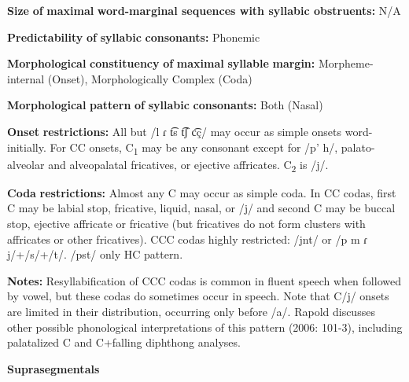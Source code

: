 \begin{styleBody}
\textbf{Size} \textbf{of} \textbf{maximal} \textbf{word{}-marginal sequences with syllabic obstruents:} N/A
\end{styleBody}

\begin{styleBody}
\textbf{Predictability} \textbf{of} \textbf{syllabic} \textbf{consonants:} Phonemic
\end{styleBody}

\begin{styleBody}
\textbf{Morphological} \textbf{constituency} \textbf{of} \textbf{maximal} \textbf{syllable} \textbf{margin:} Morpheme-internal (Onset), Morphologically Complex (Coda)
\end{styleBody}

\begin{styleBody}
\textbf{Morphological} \textbf{pattern} \textbf{of} \textbf{syllabic} \textbf{consonants:} Both (Nasal)
\end{styleBody}

\begin{styleBody}
\textbf{Onset} \textbf{restrictions:} All but /l ɾ t͡s t͡ʃ c͡ç/ may occur as simple onsets word-initially. For CC onsets, C\textsubscript{1} may be any consonant except for /p’ h/, palato-alveolar and alveopalatal fricatives, or ejective affricates. C\textsubscript{2} is /j/.
\end{styleBody}

\begin{styleBody}
\textbf{Coda} \textbf{restrictions:} Almost any C may occur as simple coda. In CC codas, first C may be labial stop, fricative, liquid, nasal, or /j/ and second C may be buccal stop, ejective affricate or fricative (but fricatives do not form clusters with affricates or other fricatives). CCC codas highly restricted: /jnt/ or /p m ɾ j/+/s/+/t/. /pst/ only HC pattern.
\end{styleBody}

\begin{styleBody}
\textbf{Notes:} Resyllabification of CCC codas is common in fluent speech when followed by vowel, but these codas do sometimes occur in speech. Note that C/j/ onsets are limited in their distribution, occurring only before /a/. Rapold discusses other possible phonological interpretations of this pattern (2006: 101-3), including palatalized C and C+falling diphthong analyses.
\end{styleBody}

\begin{styleBody}
\textbf{Suprasegmentals}
\end{styleBody}

